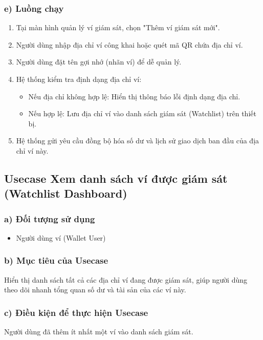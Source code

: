 \documentclass[a4paper]{report}
\begin{document}
\subsubsection{e) Luồng chạy}
\begin{enumerate}
    \item Tại màn hình quản lý ví giám sát, chọn "Thêm ví giám sát mới".
    \item Người dùng nhập địa chỉ ví công khai hoặc quét mã QR chứa địa chỉ ví.
    \item Người dùng đặt tên gợi nhớ (nhãn ví) để dễ quản lý.
    \item Hệ thống kiểm tra định dạng địa chỉ ví:
    \begin{itemize}
        \item Nếu địa chỉ không hợp lệ: Hiển thị thông báo lỗi định dạng địa chỉ.
        \item Nếu hợp lệ: Lưu địa chỉ ví vào danh sách giám sát (Watchlist) trên thiết bị.
    \end{itemize}
    \item Hệ thống gửi yêu cầu đồng bộ hóa số dư và lịch sử giao dịch ban đầu của địa chỉ ví này.
\end{enumerate}

\subsection{Usecase Xem danh sách ví được giám sát (Watchlist Dashboard)}

\subsubsection{a) Đối tượng sử dụng}
\begin{itemize}
    \item Người dùng ví (Wallet User)
\end{itemize}

\subsubsection{b) Mục tiêu của Usecase}
Hiển thị danh sách tất cả các địa chỉ ví đang được giám sát, giúp người dùng theo dõi nhanh tổng quan số dư và tài sản của các ví này.

\subsubsection{c) Điều kiện để thực hiện Usecase}
Người dùng đã thêm ít nhất một ví vào danh sách giám sát.
\end{document}
